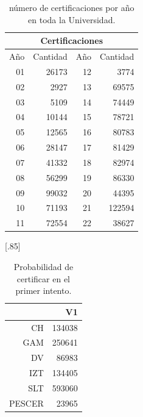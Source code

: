 \documentclass[12pt]{article}
\begin{document}
\begin{table}[ht]
\centering
\begin{tabular}{||r||r||r|r||}\hline
\multicolumn{4}{|c|}{Certificaciones} \\\hline
Año  & Cantidad  & Año  & Cantidad  \\\hline
01 & 26173& 12 & 3774 \\ 
  02 & 2927 &13 & 69575  \\ 
  03 & 5109 & 14 & 74449\\ 
  04 & 10144 & 15 & 78721\\ 
  05 & 12565 &16 & 80783 \\ 
  06 & 28147 &17 & 81429\\ 
  07 & 41332 &18 & 82974\\ 
  08 & 56299 &19 & 86330\\ 
  09 & 99032 &20 & 44395\\ 
  10 & 71193 &21 & 122594 \\ 
  11 & 72554 &22 & 38627\\
\hline
\end{tabular}
\caption{\label{CertificacionesAnual}n\'umero de certificaciones por a\~no en toda la Universidad.}
\end{table}

\begin{table}[ht!]
\centering
\scalebox{0.75}[.85]{
\begin{tabular}{rr}
  \hline
 & V1 \\ 
  \hline
CH & 134038 \\ 
  GAM & 250641 \\ 
  DV & 86983 \\ 
  IZT & 134405 \\ 
  SLT & 593060 \\ 
  PESCER & 23965 \\ 
   \hline
\end{tabular}
}
\caption{\label{Prob_Cert_Intento_1}Probabilidad de certificar en el primer intento.}
\end{table}
\end{document}
